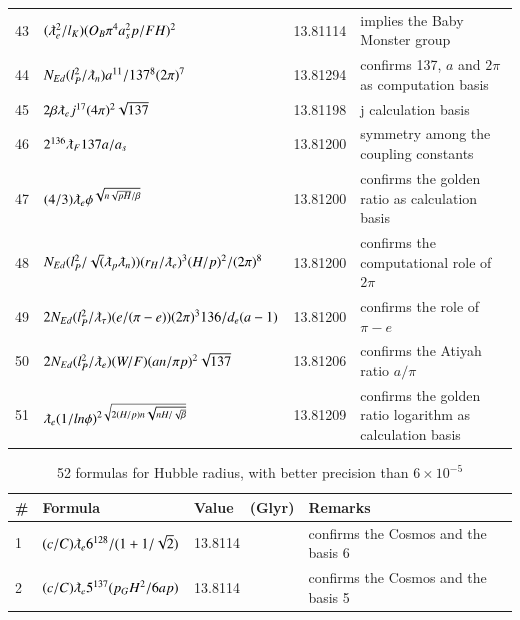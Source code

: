 \documentclass[a4paper,9pt]{article}
\begin{document}
\begin{appendix}
\begin{table}
\begin{tabular}{llll}
   43 & $(\lambdabar_{e} ^2/l_K)(O_B \pi^4 a_s^2 p/FH)^2$ & 13.81114 & implies the Baby Monster group\\
   44 & $N_{Ed}(l_P^2/ \lambdabar_n) a^{11}/137^8 (2\pi)^7   $ & 13.81294 & confirms 137, $a$ and $2\pi$ as computation basis\\
   45 & $2\beta \lambdabar_{e} j^{17} (4\pi)^2 \sqrt{137}$ & 13.81198 & j calculation basis \\
   46 & $ 2^{136}\lambdabar_{F}137 a/a_s $ & 13.81200 & symmetry among the coupling constants \\
   47 & $ (4/3)\lambdabar_e \phi^{\sqrt {n\sqrt{pH}/\beta}} $ & 13.81200 & confirms the golden ratio as calculation basis \\ 
   48 & $N_{Ed}(l_P^2/\sqrt(\lambdabar_p \lambdabar_n)) (r_H/\lambdabar_e)^3 (H/p)^2 / (2\pi)^8  $ & 13.81200 & confirms the computational role of $2\pi$\\ 
   49 & $2N_{Ed}(l_P^2/\lambdabar_{\tau}) (e/(\pi-e)) (2\pi)^3 136/d_e(a-1) $ & 13.81200 & confirms the role of $\pi - e$\\
   50 & $2N_{Ed}(l_P^2/\lambdabar_e) (W/F) (an/\pi p)^2 \sqrt{137} $ & 13.81206 & confirms the Atiyah ratio $a/\pi$\\
   51 & $ \lambdabar_e (1/ln\phi)^{2\sqrt {2(H/p)n\sqrt{nH/\sqrt\beta}}} $ & 13.81209 & confirms the golden ratio logarithm as calculation basis \\ 
   
    \bottomrule
  \end{tabular}
\end{table}




\begin{table}
\caption{52 formulas for Hubble radius, with better precision than $6 \times 10^{-5}$}
\label{tab:6:table6}
  \hskip-2.0cm\begin{tabular}{llll}
    \toprule
    \cmidrule(r){1-4}
   \#     & Formula     & Value~~(Glyr) & Remarks \\
    \midrule    
    
  1 & $ (c/C) \lambdabar_{e}  6^{128}/(1+1/\sqrt2)  $ & 13.8114 & confirms the Cosmos and the basis 6 \\
  
    2 & $(c/C) \lambdabar_{e}  5^{137} (p_G H^2/6ap)  $ & 13.8114 & confirms the Cosmos and the basis 5 \\
    

\end{tabular}
\end{table}
\end{appendix}
\end{document}
